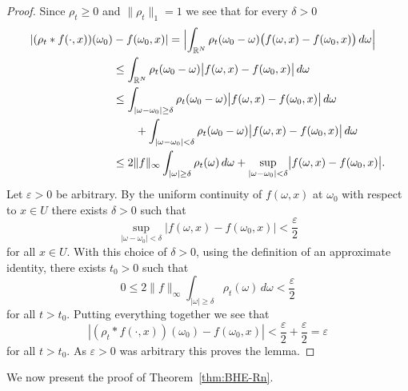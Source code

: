 \documentclass[a4paper, reqno,titlepage]{amsart}
\numberwithin{equation}{section}
\theoremstyle{plain}
\theoremstyle{definition}
\theoremstyle{remark}
\newcommand{\RR}{\mathbb{R}}
\begin{document}
\begin{proof}
  Since $\rho_t\geq 0$ and $\|\rho_t\|_1=1$ we see that for every $\delta>0$
  \begin{equation*}
    \begin{split}
      |(\rho_t * f(\cdot,x))(\omega_0)&-f(\omega_0,x)|
      =\Bigl|\int_{\RR^N}\rho_t(\omega_0-\omega)\bigl(f(\omega,x)-f(\omega_0,x)\bigr)\,d\omega\Bigr|\\
      &\leq\int_{\RR^N}\rho_t(\omega_0-\omega)\bigl|f(\omega,x)-f(\omega_0,x)\bigr|\,d\omega\\
      &\leq\int_{|\omega-\omega_0|\geq\delta}\rho_t(\omega_0-\omega)\bigl|f(\omega,x)-f(\omega_0,x)\bigr|\,d\omega\\
      &\qquad+\int_{|\omega-\omega_0|<\delta}\rho_t(\omega_0-\omega)\bigl|f(\omega,x)-f(\omega_0,x)\bigr|\,d\omega\\
      &\leq 2\|f\|_\infty\int_{|\omega|\geq\delta}\rho_t(\omega)\,d\omega
      +\sup_{|\omega-\omega_0|<\delta}\bigl|f(\omega,x)-f(\omega_0,x)\bigr|.
    \end{split}
  \end{equation*}
  Let $\varepsilon>0$ be arbitrary. By the uniform continuity of $f(\omega,x)$ at $\omega_0$ with respect to $x\in U$ there exists $\delta>0$ such that
  \begin{equation*}
    \sup_{|\omega-\omega_0|<\delta}\bigl|f(\omega,x)-f(\omega_0,x)\bigr|<\frac{\varepsilon}{2}
  \end{equation*}
  for all $x\in U$. With this choice of $\delta>0$, using the definition of an approximate identity, there exists $t_0>0$ such that
  \begin{equation*}
    0\leq  2\|f\|_\infty\int_{|\omega|\geq\delta}\rho_t(\omega)\,d\omega<\frac{\varepsilon}{2}
  \end{equation*}
  for all $t>t_0$.  Putting everything together we see that
  \begin{equation*}
    |(\rho_t * f(\cdot,x))(\omega_0)-f(\omega_0,x)|
    <\frac{\varepsilon}{2}+\frac{\varepsilon}{2}
    =\varepsilon
  \end{equation*}
  for all $t>t_0$. As $\varepsilon>0$ was arbitrary this proves the lemma.
\end{proof}

We now present the proof of Theorem~\ref{thm:BHE-Rn}.
\end{document}
